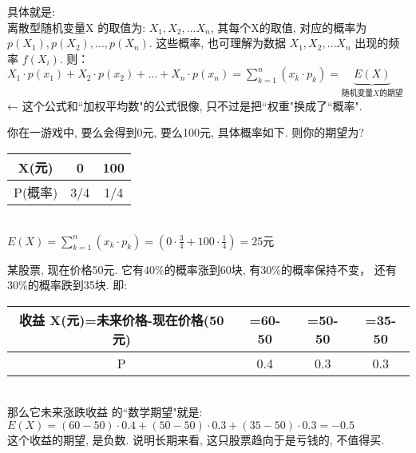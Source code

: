 \documentclass[UTF8]{ctexart}
\begin{document}
	具体就是: \\
	离散型随机变量X 的取值为: $ X_1, X_2, ... X_n$, 其每个X的取值, 对应的概率为 $ p(X_1), p(X_2),..., p(X_n)$. 这些概率, 也可理解为数据 $ X_1, X_2, ... X_n$ 出现的频率 $ f(X_i)$. 则： \\
	$\boxed{
	X_1\cdot p(x_1)+X_2\cdot p(x_2)+...+X_n\cdot p(x_n)=\sum_{k=1}^n{(x_k \cdot p_k)}=\underset{\text{随机变量}X\text{的期望}}{\underbrace{E(X)}}
	}$ \\
	← 这个公式和``加权平均数"的公式很像, 只不过是把``权重"换成了``概率". \\
	
	
	
	
\begin{myEnvSample}
你在一游戏中, 要么会得到0元, 要么100元, 具体概率如下. 则你的期望为? \\
\begin{tabular}{|c|c|c|}
	\hline
	X(元) & 0 & 100 \\
	\hline
	P(概率) & 3/4 & 1/4 \\
	\hline
\end{tabular} \\

$E(X)=\sum_{k=1}^n{(x_k\cdot p_k)}=\left( 0\cdot \frac{3}{4}+100\cdot \frac{1}{4} \right) =25\text{元}$ 
\end{myEnvSample}
	\vspace{1em} 
	
	
	
	
	\begin{myEnvSample}
某股票, 现在价格50元. 它有40\%的概率涨到60块, 有30\%的概率保持不变， 还有30\%的概率跌到35块. 即: \\
\begin{tabular}{|c|c|c|c|}
	\hline
	收益 X(元)=未来价格-现在价格(50元) & =60-50 & =50-50 & =35-50 \\
	\hline
	P & 0.4 & 0.3 & 0.3 \\
	\hline
\end{tabular} \\

那么它未来涨跌收益 的``数学期望"就是:  \\
$E(X) = (60-50) \cdot 0.4 + (50-50) \cdot 0.3 + (35-50) \cdot 0.3 = -0.5$  \\
这个收益的期望, 是负数. 说明长期来看, 这只股票趋向于是亏钱的, 不值得买.
	\end{myEnvSample}
	\vspace{1em} 
	
	
	
\end{document}
